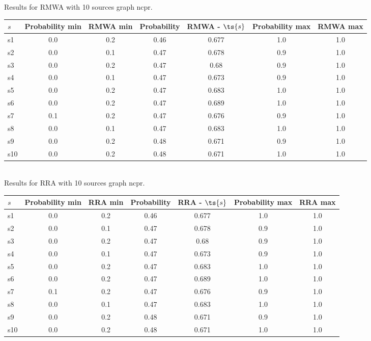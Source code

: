 \documentclass{article}
\begin{document}
\noindent Results for RMWA with 10 sources graph ncpr.

\noindent\begin{tabular}{|l|c|c|c|c|c|c|}
\hline
$s$& Probability min & RMWA min & Probability & RMWA - $\ts{s}$ & Probability max & RMWA max\\
\hline
s1 &0.0 & 0.2 & 0.46 & 0.677 & 1.0 & 1.0\\
\hline
s2 &0.0 & 0.1 & 0.47 & 0.678 & 0.9 & 1.0\\
\hline
s3 &0.0 & 0.2 & 0.47 & 0.68 & 0.9 & 1.0\\
\hline
s4 &0.0 & 0.1 & 0.47 & 0.673 & 0.9 & 1.0\\
\hline
s5 &0.0 & 0.2 & 0.47 & 0.683 & 1.0 & 1.0\\
\hline
s6 &0.0 & 0.2 & 0.47 & 0.689 & 1.0 & 1.0\\
\hline
s7 &0.1 & 0.2 & 0.47 & 0.676 & 0.9 & 1.0\\
\hline
s8 &0.0 & 0.1 & 0.47 & 0.683 & 1.0 & 1.0\\
\hline
s9 &0.0 & 0.2 & 0.48 & 0.671 & 0.9 & 1.0\\
\hline
s10 &0.0 & 0.2 & 0.48 & 0.671 & 1.0 & 1.0\\
\hline
\end{tabular}\\

\noindent Results for RRA with 10 sources graph ncpr.

\noindent\begin{tabular}{|l|c|c|c|c|c|c|}
\hline
$s$& Probability min & RRA min & Probability & RRA - $\ts{s}$ & Probability max & RRA max\\
\hline
s1 &0.0 & 0.2 & 0.46 & 0.677 & 1.0 & 1.0\\
\hline
s2 &0.0 & 0.1 & 0.47 & 0.678 & 0.9 & 1.0\\
\hline
s3 &0.0 & 0.2 & 0.47 & 0.68 & 0.9 & 1.0\\
\hline
s4 &0.0 & 0.1 & 0.47 & 0.673 & 0.9 & 1.0\\
\hline
s5 &0.0 & 0.2 & 0.47 & 0.683 & 1.0 & 1.0\\
\hline
s6 &0.0 & 0.2 & 0.47 & 0.689 & 1.0 & 1.0\\
\hline
s7 &0.1 & 0.2 & 0.47 & 0.676 & 0.9 & 1.0\\
\hline
s8 &0.0 & 0.1 & 0.47 & 0.683 & 1.0 & 1.0\\
\hline
s9 &0.0 & 0.2 & 0.48 & 0.671 & 0.9 & 1.0\\
\hline
s10 &0.0 & 0.2 & 0.48 & 0.671 & 1.0 & 1.0\\
\hline
\end{tabular}\\
\end{document}
